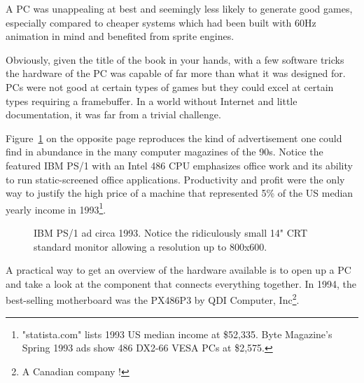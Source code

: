 \par
 A PC was unappealing at best and seemingly less likely to generate good games, especially compared to cheaper systems which had been built with 60Hz animation in mind and benefited from sprite engines.\\
 \par
  Obviously, given the title of the book in your hands, with a few software tricks the hardware of the PC was capable of far more than what it was designed for. PCs were not good at certain types of games but they could excel at certain types requiring a framebuffer. In a world without Internet and little documentation, it was far from a trivial challenge.\\
\par

Figure~\ref{ibm_ps1_top} on the opposite page reproduces the kind of advertisement one could find in abundance in the many computer magazines of the 90s. Notice the featured IBM PS/1 with an Intel 486 CPU emphasizes office work and its ability to run static-screened office applications. Productivity and profit were the only way to justify the high price of a machine that represented 5\% of the US median yearly income in 1993\footnote{ "statista.com" lists 1993 US median income at \$52,335. Byte Magazine's Spring 1993 ads show 486 DX2-66 VESA PCs at \$2,575.}.\\
\par

\par
\begin{figure}[H] \centering
{}
\caption{IBM PS/1 ad circa 1993. Notice the ridiculously small 14" CRT standard monitor allowing a resolution up to 800x600.}
\label{ibm_ps1_top}
\end{figure}


















\cleartoleftpage
 
A practical way to get an overview of the hardware available is to open up a PC and take a look at the component that connects everything together. In 1994, the best-selling motherboard was the PX486P3 by QDI Computer, Inc\footnote{A Canadian company  !}.\\

